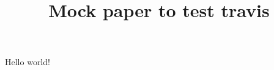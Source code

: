 \documentclass{article}
\title{Mock paper to test travis}
\begin{document}
\maketitle
Hello world!
\end{document}
